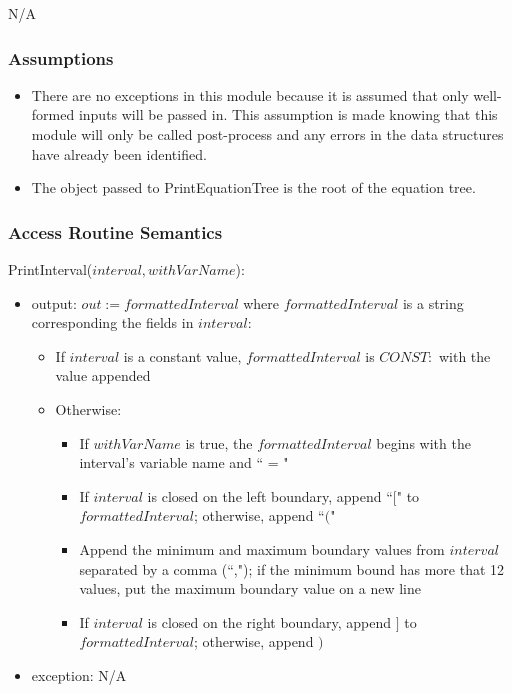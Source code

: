 \documentclass[12pt, titlepage]{article}
\begin{document}
N/A

\subsubsection{Assumptions}

\begin{itemize}
	\item There are no exceptions in this module because it is assumed that 
	only well-formed inputs will be passed in. This assumption is made knowing 
	that this module will only be called post-process and any errors in the 
	data structures have already been identified.
	\item The object passed to PrintEquationTree is the root of the equation 
	tree.
\end{itemize}


\subsubsection{Access Routine Semantics}

\noindent PrintInterval($interval, withVarName$):
\begin{itemize}
	\item output: $out := formattedInterval$ where $formattedInterval$ is a 
	string corresponding the fields in $interval$:
	\begin{itemize}
		\item If $interval$ is a constant value, $formattedInterval$ is 
		$CONST:$ with the value appended
		\item Otherwise:
		\begin{itemize}
			\item If $withVarName$ is true, the $formattedInterval$ begins with 
			the interval's variable name and `` = "
			\item If $interval$ is closed on the left boundary, append ``$[$" 
			to $formattedInterval$; otherwise, append ``$($"
			\item Append the minimum and maximum boundary values from 
			$interval$ 
			separated by a comma (``,"); if the minimum bound has more that 12 
			values, put the maximum boundary value on a new line
			\item If $interval$ is closed on the right boundary, append $]$ to 
			$formattedInterval$; otherwise, append $)$
		\end{itemize}
	\end{itemize}
	\item exception: N/A
\end{itemize}
\end{document}
